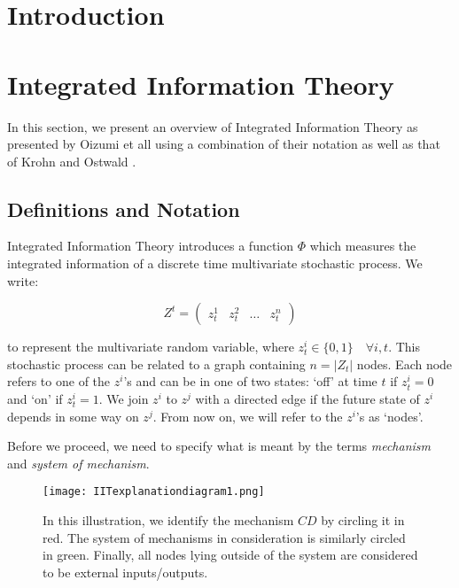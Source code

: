 


\section{Introduction}

\section{Integrated Information Theory}

In this section, we present an overview of Integrated Information Theory as presented by Oizumi et all \cite{main} using a combination of their notation as well as that of Krohn and Ostwald \cite{krohn2016computing}.

\subsection{Definitions and Notation}

Integrated Information Theory introduces a function $\Phi$ which measures the integrated information of a discrete time multivariate stochastic process. We write:

\begin{equation}
\label{def:1}
Z^t = \left(\begin{array}{cccc} z^1_t&z^2_t&\ldots&z^n_t\end{array}\right)
\end{equation}

to represent the multivariate random variable, where $z^i_t \in \{0,1\} \quad\forall i, t$. This stochastic process can be related to a graph containing $n = |Z_t|$ nodes. Each node refers to one of the $z^i$'s and can be in one of two states: `off' at time $t$ if $z^i_t=0$ and `on' if $z^i_t = 1$. We join $z^i$ to $z^j$ with a directed edge if the future state of $z^i$ depends in some way on $z^j$. From now on, we will refer to the $z^i$'s as `nodes'.

Before we proceed, we need to specify what is meant by the terms \textit{mechanism} and \textit{system of mechanism}.

\begin{figure}[ht]
	\centering
	
	\texttt{[image: IITexplanationdiagram1.png]}
	\caption{In this illustration, we identify the mechanism $CD$ by circling it in red. The system of mechanisms in consideration is similarly circled in green. Finally, all nodes lying outside of the system are considered to be external inputs/outputs.}
	\label{fig:IIT_illustration1}
\end{figure}


